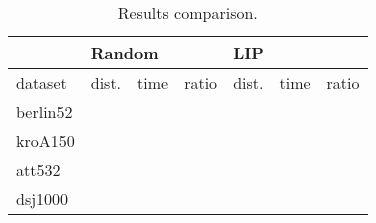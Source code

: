 \begin{table}[!htb]
	\centering
	\begin{tabular}{l|lll|lll|}
		\cline{2-7}
		& \multicolumn{3}{l|}{Random}                                    & \multicolumn{3}{l|}{LIP}                                       \\ \hline
		\multicolumn{1}{|l|}{dataset}  & \multicolumn{1}{l|}{dist.} & \multicolumn{1}{l|}{time} & ratio & \multicolumn{1}{l|}{dist.} & \multicolumn{1}{l|}{time} & ratio \\ \hline
		\multicolumn{1}{|l|}{berlin52} & \multicolumn{1}{l|}{}      & \multicolumn{1}{l|}{}     &       & \multicolumn{1}{l|}{}      & \multicolumn{1}{l|}{}     &       \\ \hline
		\multicolumn{1}{|l|}{kroA150}  & \multicolumn{1}{l|}{}      & \multicolumn{1}{l|}{}     &       & \multicolumn{1}{l|}{}      & \multicolumn{1}{l|}{}     &       \\ \hline
		\multicolumn{1}{|l|}{att532}   & \multicolumn{1}{l|}{}      & \multicolumn{1}{l|}{}     &       & \multicolumn{1}{l|}{}      & \multicolumn{1}{l|}{}     &       \\ \hline
		\multicolumn{1}{|l|}{dsj1000}  & \multicolumn{1}{l|}{}      & \multicolumn{1}{l|}{}     &       & \multicolumn{1}{l|}{}      & \multicolumn{1}{l|}{}     &       \\ \hline
	\end{tabular}
	\caption{Results comparison.}
	\label{tab:results_comp}
\end{table}
